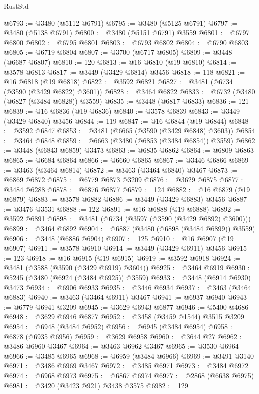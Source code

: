 \begin{lexlean}{RustStd}
\begin{coremodule}
{{{{{{{{{{{{{{{{{{{@6793 := @3480 (@5112 @6791)
@6795 := @3480 (@5125 @6791)
@6797 := @3480 (@5138 @6791)
@6800 := @3480 (@5151 @6791) @3559
@6801 := @6797 @6800
@6802 := @6795 @6801
@6803 := @6793 @6802
@6804 := @6790 @6803
@6805 := @6719 @6804
@6807 := @3700 (@6717 @6805)
@6809 := @3448 (@6687 @6807)
@6810 := 120
@6813 := @16 @6810 (@19 @6810)
@6814 := @3578 @6813
@6817 := @3449 (@3429 @6814) @3456
@6818 := 118
@6821 := @16 @6818 (@19 @6818)
@6822 := @3592 @6821
@6827 := @3481 (@6734 (@3590 (@3429 @6822) @3601))
@6828 := @3464 @6822
@6833 := @6732 (@3480 (@6827 (@3484 @6828)) @3559)
@6835 := @3448 (@6817 @6833)
@6836 := 121
@6839 := @16 @6836 (@19 @6836)
@6840 := @3578 @6839
@6843 := @3449 (@3429 @6840) @3456
@6844 := 119
@6847 := @16 @6844 (@19 @6844)
@6848 := @3592 @6847
@6853 := @3481 (@6665 (@3590 (@3429 @6848) @3603))
@6854 := @3464 @6848
@6859 := @6663 (@3480 (@6853 (@3484 @6854)) @3559)
@6862 := @3448 (@6843 @6859) @3473
@6863 := @6835 @6862
@6864 := @6809 @6863
@6865 := @6684 @6864
@6866 := @6660 @6865
@6867 := @3446 @6866
@6869 := @3463 (@3464 @6814)
@6872 := @3463 (@3464 @6840) @3467
@6873 := @6869 @6872
@6875 := @6779 @6873 @3209
@6876 := @3629 @6875
@6877 := @3484 @6288
@6878 := @6876 @6877
@6879 := 124
@6882 := @16 @6879 (@19 @6879)
@6883 := @3578 @6882
@6886 := @3449 (@3429 @6883) @3456
@6887 := @3476 @3531
@6888 := 122
@6891 := @16 @6888 (@19 @6888)
@6892 := @3592 @6891
@6898 := @3481 (@6734 (@3597 (@3590 (@3429 @6892) @3600)))
@6899 := @3464 @6892
@6904 := @6887 (@3480 (@6898 (@3484 @6899)) @3559)
@6906 := @3448 (@6886 @6904)
@6907 := 125
@6910 := @16 @6907 (@19 @6907)
@6911 := @3578 @6910
@6914 := @3449 (@3429 @6911) @3456
@6915 := 123
@6918 := @16 @6915 (@19 @6915)
@6919 := @3592 @6918
@6924 := @3481 (@3588 (@3590 (@3429 @6919) @3604))
@6925 := @3464 @6919
@6930 := @5245 (@3480 (@6924 (@3484 @6925)) @3559)
@6933 := @3448 (@6914 @6930) @3473
@6934 := @6906 @6933
@6935 := @3446 @6934
@6937 := @3463 (@3464 @6883)
@6940 := @3463 (@3464 @6911) @3467
@6941 := @6937 @6940
@6943 := @6779 @6941 @3209
@6945 := @3629 @6943 @6877
@6946 := @5400 @4686
@6948 := @3629 @6946 @6877
@6952 := @3458 (@3459 @1544) @3515 @3209
@6954 := @6948 (@3484 @6952)
@6956 := @6945 (@3484 @6954)
@6958 := @6878 (@6935 @6956)
@6959 := @3629 @6958
@6960 := @3644 @27
@6962 := @3486 @6960 @3467
@6964 := @3463 @6962 @3467
@6965 := @3530 @6964
@6966 := @3485 @6965
@6968 := @6959 (@3484 @6966)
@6969 := @3491 @3140
@6971 := @3486 @6969 @3467
@6972 := @3485 @6971
@6973 := @3484 @6972
@6974 := @6968 @6973
@6975 := @6867 @6974
@6977 := @2868 (@6638 @6975)
@6981 := @3420 (@3423 @921) @3438 @3575
@6982 := 129
}}}}}}}}}}}}}}}}}}}
\end{coremodule}
\end{lexlean}
